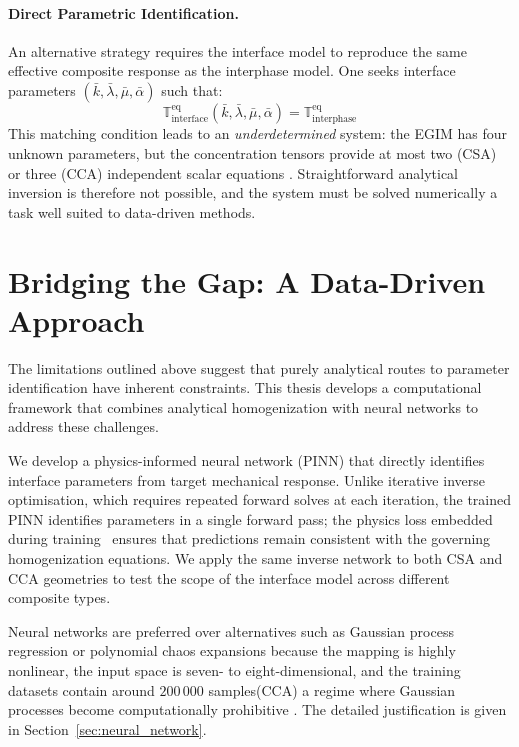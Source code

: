 \documentclass[oneside, 12pt, a4paper, bibliography=totoc]{book}
\begin{document}
\paragraph{Direct Parametric Identification.}
An alternative strategy requires the interface model to reproduce the same effective composite response as the interphase model. One seeks interface parameters $(\bar{k}, \bar{\lambda}, \bar{\mu}, \bar{\alpha})$ such that:
%
\begin{equation}
    \mathbb{T}^{\text{eq}}_{\text{interface}}(\bar{k}, \bar{\lambda}, \bar{\mu}, \bar{\alpha}) = \mathbb{T}^{\text{eq}}_{\text{interphase}}
    \label{eq:matching_condition}
\end{equation}
%
This matching condition leads to an \textit{underdetermined} system: the EGIM has four unknown parameters, but the concentration tensors provide at most two (CSA) or three (CCA) independent scalar equations \cite{Firooz2021}. Straightforward analytical inversion is therefore not possible, and the system must be solved numerically a task well suited to data-driven methods.



\section{Bridging the Gap: A Data-Driven Approach}

The limitations outlined above suggest that purely analytical routes to parameter identification have inherent constraints. This thesis develops a computational framework that combines analytical homogenization with neural networks to address these challenges.

We develop a physics-informed neural network (PINN) that directly identifies interface parameters from target mechanical response. Unlike iterative inverse optimisation, which requires repeated forward solves at each iteration, the trained PINN identifies parameters in a single forward pass; the physics loss embedded during training~\cite{Raissi2019} ensures that predictions remain consistent with the governing homogenization equations. We apply the same inverse network to both CSA and CCA geometries to test the scope of the interface model across different composite types.

Neural networks are preferred over alternatives such as Gaussian process regression \cite{Rasmussen2006} or polynomial chaos expansions \cite{Xiu2002} because the mapping is highly nonlinear, the input space is seven- to eight-dimensional, and the training datasets contain around $200\,000$ samples(CCA) a regime where Gaussian processes become computationally prohibitive \cite{Liu2020}. The detailed justification is given in Section~\ref{sec:neural_network}.
\end{document}
